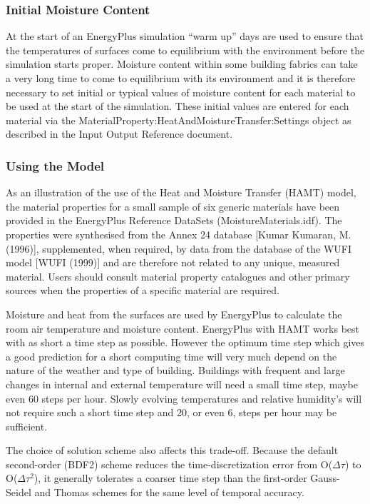 \subsubsection{Initial Moisture Content}\label{initial-moisture-content}

At the start of an EnergyPlus simulation ``warm up'' days are used to ensure that the temperatures of surfaces come to equilibrium with the environment before the simulation starts proper. Moisture content within some building fabrics can take a very long time to come to equilibrium with its environment and it is therefore necessary to set initial or typical values of moisture content for each material to be used at the start of the simulation. These initial values are entered for each material via the MaterialProperty:HeatAndMoistureTransfer:Settings object as described in the Input Output Reference document.

\subsubsection{Using the Model}\label{using-the-model}

As an illustration of the use of the Heat and Moisture Transfer (HAMT) model, the material properties for a small sample of six generic materials have been provided in the EnergyPlus Reference DataSets (MoistureMaterials.idf). The properties were synthesised from the Annex 24 database {[}Kumar Kumaran, M. (1996){]}, supplemented, when required, by data from the database of the WUFI model {[}WUFI (1999){]} and are therefore not related to any unique, measured material. Users should consult material property catalogues and other primary sources when the properties of a specific material are required.

Moisture and heat from the surfaces are used by EnergyPlus to calculate the room air temperature and moisture content. EnergyPlus with HAMT works best with as short a time step as possible. However the optimum time step which gives a good prediction for a short computing time will very much depend on the nature of the weather and type of building. Buildings with frequent and large changes in internal and external temperature will need a small time step, maybe even 60 steps per hour. Slowly evolving temperatures and relative humidity's will not require such a short time step and 20, or even 6, steps per hour may be sufficient.

The choice of solution scheme also affects this trade-off. Because the default second-order (BDF2) scheme reduces the time-discretization error from O(\(\Delta \tau\)) to O(\(\Delta \tau^2\)), it generally tolerates a coarser time step than the first-order Gauss-Seidel and Thomas schemes for the same level of temporal accuracy.

